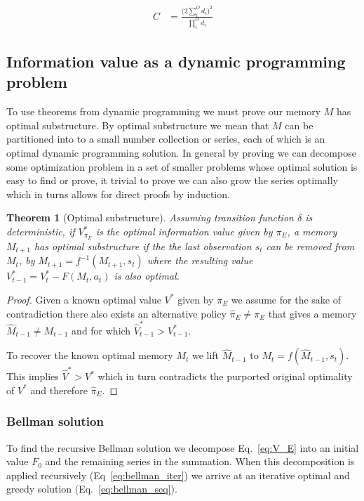 \documentclass[10pt,letterpaper]{article}
\newtheorem{theorem}{Theorem}
\begin{document}
\begin{equation} \label{eq:compactcude}
\begin{split}
    C & = \frac{\Big ( 2 \sum^{O}_{i} d_i \Big )^2}{\prod^{O}_{i} d_i}
\end{split}
\end{equation}

\subsection*{Information value as a dynamic programming problem}
To use theorems from dynamic programming \cite{Roughgarden2019,Sutton2018} we must prove our memory $M$ has optimal substructure. By optimal substructure we mean that $M$ can be partitioned into to a small number collection or series, each of which is an optimal dynamic programming solution. In general by proving we can decompose some optimization problem in a set of smaller problems whose optimal solution is easy to find or prove, it trivial to prove we can also grow the series optimally which in turns allows for direct proofs by induction.

\begin{theorem}[Optimal substructure] \label{theorem:opt_sub}
    Assuming transition function $\delta$ is deterministic, if $V^*_{\pi_E}$ is the optimal information value given by $\pi_E$, a memory $M_{t+1}$ has optimal substructure if the the last observation $s_t$ can be removed from $M_t$, by $M_{t+1} = f^{-1}(M_{t+1}, s_t)$ where the resulting value $V^*_{t-1} = V^*_{t} - F(M_t, a_t)$ is also optimal. 
\end{theorem}
\begin{proof}
    Given a known optimal value $V^*$ given by $\pi_E$ we assume for the sake of contradiction there also exists an alternative policy $\hat \pi_E \neq \pi_E$ that gives a memory $\hat M_{t-1} \neq M_{t-1}$ and for which $\hat V^*_{t-1} > V^*_{t-1}$. 

    To recover the known optimal memory $M_t$ we lift $\hat M_{t-1}$ to $M_t = f(\hat M_{t-1}, s_t)$. This implies $\hat V^* > V^*$ which in turn contradicts the purported original optimality of $V^*$ and therefore $\hat \pi_E$.
\end{proof}

\subsubsection{Bellman solution}
To find the recursive Bellman solution we decompose Eq.~\ref{eq:V_E} into an initial value $F_0$ and the remaining series in the summation. When this decomposition is applied recursively (Eq~\ref{eq:bellman_iter}) we arrive at an iterative optimal and greedy solution (Eq.~\ref{eq:bellman_seq}). 
\end{document}
